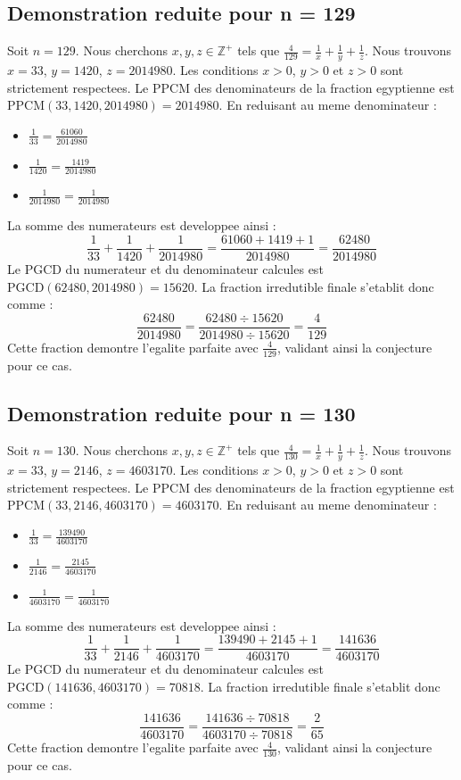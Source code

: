 \documentclass[11pt,a4paper]{article}
\begin{document}
\subsection{Demonstration reduite pour n = 129}
Soit $n = 129$. Nous cherchons $x, y, z \in \mathbb{Z}^{+}$ tels que $\frac{4}{129} = \frac{1}{x} + \frac{1}{y} + \frac{1}{z}$.
Nous trouvons $x = 33$, $y = 1420$, $z = 2014980$.
Les conditions $x > 0$, $y > 0$ et $z > 0$ sont strictement respectees.
Le PPCM des denominateurs de la fraction egyptienne est $\text{PPCM}(33, 1420, 2014980) = 2014980$.
En reduisant au meme denominateur :
\begin{itemize}
    \item $\frac{1}{33} = \frac{61060}{2014980}$
    \item $\frac{1}{1420} = \frac{1419}{2014980}$
    \item $\frac{1}{2014980} = \frac{1}{2014980}$
\end{itemize}
La somme des numerateurs est developpee ainsi :
$$ \frac{1}{33} + \frac{1}{1420} + \frac{1}{2014980} = \frac{61060 + 1419 + 1}{2014980} = \frac{62480}{2014980} $$
Le PGCD du numerateur et du denominateur calcules est $\text{PGCD}(62480, 2014980) = 15620$.
La fraction irredutible finale s'etablit donc comme :
$$ \frac{62480}{2014980} = \frac{62480 \div 15620}{2014980 \div 15620} = \frac{4}{129} $$
Cette fraction demontre l'egalite parfaite avec $\frac{4}{129}$, validant ainsi la conjecture pour ce cas.

\subsection{Demonstration reduite pour n = 130}
Soit $n = 130$. Nous cherchons $x, y, z \in \mathbb{Z}^{+}$ tels que $\frac{4}{130} = \frac{1}{x} + \frac{1}{y} + \frac{1}{z}$.
Nous trouvons $x = 33$, $y = 2146$, $z = 4603170$.
Les conditions $x > 0$, $y > 0$ et $z > 0$ sont strictement respectees.
Le PPCM des denominateurs de la fraction egyptienne est $\text{PPCM}(33, 2146, 4603170) = 4603170$.
En reduisant au meme denominateur :
\begin{itemize}
    \item $\frac{1}{33} = \frac{139490}{4603170}$
    \item $\frac{1}{2146} = \frac{2145}{4603170}$
    \item $\frac{1}{4603170} = \frac{1}{4603170}$
\end{itemize}
La somme des numerateurs est developpee ainsi :
$$ \frac{1}{33} + \frac{1}{2146} + \frac{1}{4603170} = \frac{139490 + 2145 + 1}{4603170} = \frac{141636}{4603170} $$
Le PGCD du numerateur et du denominateur calcules est $\text{PGCD}(141636, 4603170) = 70818$.
La fraction irredutible finale s'etablit donc comme :
$$ \frac{141636}{4603170} = \frac{141636 \div 70818}{4603170 \div 70818} = \frac{2}{65} $$
Cette fraction demontre l'egalite parfaite avec $\frac{4}{130}$, validant ainsi la conjecture pour ce cas.
\end{document}
